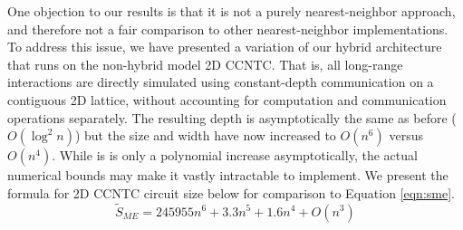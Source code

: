 One objection to our results is that it is not a purely nearest-neighbor approach,
and therefore not a fair comparison to other nearest-neighbor implementations.
To address this issue, we have presented a variation of our hybrid architecture
that runs on the non-hybrid model \textsf{2D CCNTC}. That is, all long-range
interactions are directly simulated using constant-depth communication on a
contiguous \textsc{2D} lattice, without accounting for computation and
communication operations separately. The resulting depth is asymptotically
the same as before ($O(\log^2 n)$) but the size and width have now
increased to $O(n^6)$ versus $O(n^4)$. While is is only a polynomial increase
asymptotically, the actual numerical bounds may make it vastly intractable
to implement. We present the formula for \textsf{2D CCNTC} circuit size below
for comparison to Equation \ref{eqn:sme}.
%
\begin{equation}
\tilde{S}_{ME} = 245955 n^6 + 3.3n^5 + 1.6n^4 + O(n^3)
\end{equation}
%
